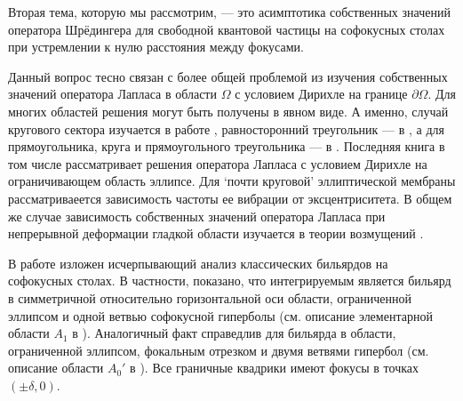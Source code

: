 Вторая тема, которую мы рассмотрим, --- это асимптотика собственных значений оператора Шрёдингера для свободной квантовой частицы на софокусных столах при устремлении к нулю расстояния между фокусами.

Данный вопрос тесно связан с более общей проблемой из изучения собственных значений оператора Лапласа в области $\Omega$ с условием Дирихле на границе $\partial \Omega$.
Для многих областей решения могут быть получены в явном виде. А именно, случай кругового сектора изучается в работе \cite{wref13}, равносторонний треугольник --- в \cite{lame1852leccons}, а для  прямоугольника, круга и прямоугольного треугольника --- в \cite{wref11}.
Последняя книга в том числе рассматривает решения оператора Лапласа с условием Дирихле на ограничивающем область эллипсе. Для  `почти круговой' эллиптической мембраны рассматриваеется зависимость частоты ее вибрации от эксцентриситета.
В общем же случае зависимость собственных значений оператора Лапласа при непрерывной деформации гладкой области изучается в теории возмущений \cite{kato2013perturbation, rellich1969perturbation}. 

%

В работе \cite{Fok15} изложен исчерпывающий анализ классических бильярдов на софокусных столах. В частности, показано, что интегрируемым является бильярд в симметричной относительно горизонтальной оси области, ограниченной эллипсом и одной ветвью софокусной гиперболы (см. описание элементарной области $A_1$ в \cite{Fok15}). Аналогичный факт справедлив для бильярда в области, ограниченной эллипсом, фокальным отрезком и двумя ветвями  гипербол (см. описание области $A_0'$ в \cite{Fok15}). 
Все граничные квадрики имеют фокусы в точках $(\pm \delta, 0)$.


